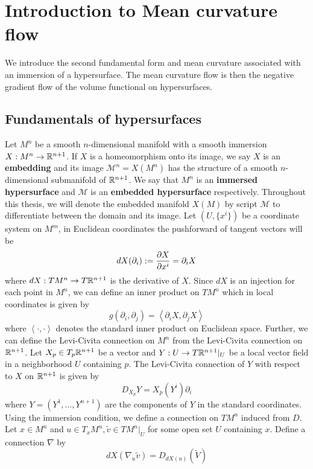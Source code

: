 \chapter{Introduction to Mean curvature flow}

We introduce the second fundamental form and mean curvature associated with an immersion of a hypersurface. The mean curvature flow is then the negative gradient flow of the volume functional on hypersurfaces. 
\section{Fundamentals of hypersurfaces}

Let $M^{n}$ be a smooth $ n $-dimensional manifold with a smooth immersion $ X : M^{n} \to \mathbb{R}^{n+1} $. If $ X $ is a homeomorphism onto its image, we say $ X $ is an \textbf{embedding}  and its image $ \mathcal{M}^{n} = X(M^{n}) $ has the structure of a smooth $ n $-dimensional submanifold of $ \mathbb{R}^{n+1} $. We say that $ M^{n} $ is an \textbf{immersed hypersurface} and $ \mathcal{M} $ is an \textbf{embedded hypersurface} respectively. Throughout this thesis, we will denote the embedded manifold $ X(M) $ by script $ \mathcal{M} $ to differentiate between the domain and its image. Let $ (U, \{x^{i}\}) $ be a coordinate system on $ M^{m} $, in Euclidean coordinates the pushforward of tangent vectors will be 
    \[ dX( \partial_{i}) := \frac{ \partial X}{ \partial x^{i}} = \partial_{i}X \]
where $ dX : TM^{n} \to T\mathbb{R}^{n+1} $ is the derivative of $ X $. Since $ dX $ is an injection for each point in $ M^{n} $, we can define an inner product on $ TM^{n} $ which in local coordinates is given by 
    \[ g( \partial_{i}, \partial_{j}) = \left< \partial_{i}X, \partial_{j}X \right> \]
where $ \left< \cdot, \cdot \right> $ denotes the standard inner product on Euclidean space. Further, we can define the Levi-Civita connection on $ M^{n} $ from the Levi-Civita connection on $ \mathbb{R}^{n+1} $. Let $ X_{p} \in T_{p}\mathbb{R}^{n+1} $ be a vector and $ Y: U \to T\mathbb{R}^{n+1}|_{U} $ be a local vector field in a neighborhood $ U $ containing $ p $. The Levi-Civita connection of $ Y $ with respect to $ X $ on  $ \mathbb{R}^{n+1} $ is given by 
\[ D_{X_{p}}Y =  X_{p}(Y^{i}) \partial_{i}\]
where $ Y = (Y^{1}, \ldots , Y^{n+1}) $ are the components of $ Y $ in the standard coordinates. Using the immersion condition, we define a connection on $ TM^{n} $ induced from $ D $.  Let $ x \in M^{n} $ and $ u \in T_{x}M^{n}, \tilde{v} \in TM^{n}|_{U}$ for some open set $ U $ containing $ x $. Define a connection $ \nabla $ by 
\begin{equation}
    dX(\nabla_{u}\tilde{v}) = D_{dX(u)}(\tilde{V}) \label{connection}
\end{equation}
